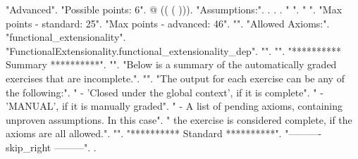 \documentclass[12pt]{report}
\begin{document}
\begin{coqdoccode}
 "Advanced".\coqdoceol
\coqdocnoindent
{} "Possible points: 6".\coqdoceol
\coqdocnoindent
{} @ (( (  ))).\coqdoceol
\coqdocnoindent
{} "Assumptions:".\coqdoceol
\coqdocnoindent
{}.\coqdoceol
\coqdocnoindent
{}  .\coqdoceol
\coqdocnoindent
{} .\coqdoceol
\coqdocnoindent
{} " ".\coqdoceol
\coqdocemptyline
\coqdocnoindent
{} " ".\coqdoceol
\coqdocemptyline
\coqdocnoindent
{} "Max points - standard: 25".\coqdoceol
\coqdocnoindent
{} "Max points - advanced: 46".\coqdoceol
\coqdocnoindent
{} "".\coqdoceol
\coqdocnoindent
{} "Allowed Axioms:".\coqdoceol
\coqdocnoindent
{} "functional\_extensionality".\coqdoceol
\coqdocnoindent
{} "FunctionalExtensionality.functional\_extensionality\_dep".\coqdoceol
\coqdocnoindent
{} "".\coqdoceol
\coqdocnoindent
{} "".\coqdoceol
\coqdocnoindent
{} "********** Summary **********".\coqdoceol
\coqdocnoindent
{} "".\coqdoceol
\coqdocnoindent
{} "Below is a summary of the automatically graded exercises that are incomplete.".\coqdoceol
\coqdocnoindent
{} "".\coqdoceol
\coqdocnoindent
{} "The output for each exercise can be any of the following:".\coqdoceol
\coqdocnoindent
{} "  - 'Closed under the global context', if it is complete".\coqdoceol
\coqdocnoindent
{} "  - 'MANUAL', if it is manually graded".\coqdoceol
\coqdocnoindent
{} "  - A list of pending axioms, containing unproven assumptions. In this case".\coqdoceol
\coqdocnoindent
{} "    the exercise is considered complete, if the axioms are all allowed.".\coqdoceol
\coqdocnoindent
{} "".\coqdoceol
\coqdocnoindent
{} "********** Standard **********".\coqdoceol
\coqdocnoindent
{} "---------- skip\_right ---------".\coqdoceol
\coqdocnoindent
{}  .\coqdoceol

\end{coqdoccode}
\end{document}
